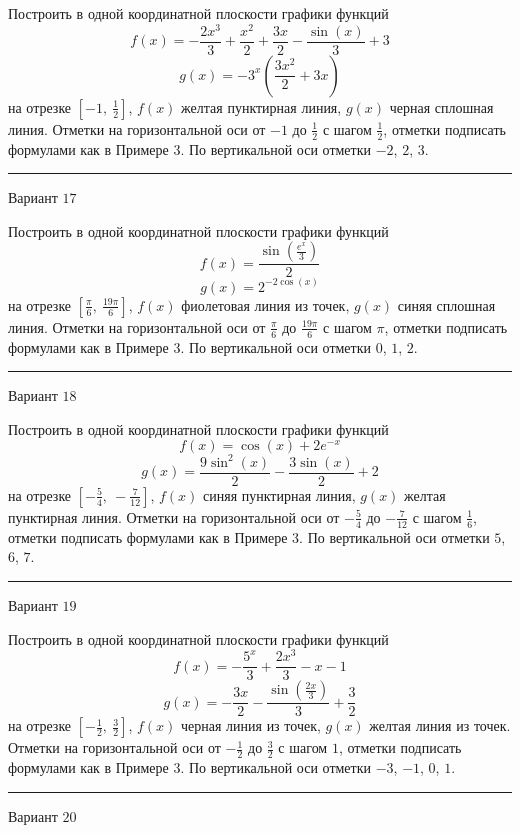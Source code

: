 \documentclass[11pt]{report}
\begin{document}
Построить в одной координатной плоскости графики функций $$f(x) = - \frac{2 x^{3}}{3} + \frac{x^{2}}{2} + \frac{3 x}{2} - \frac{\sin{\left(x \right)}}{3} + 3$$ $$g(x) = - 3^{x} \left(\frac{3 x^{2}}{2} + 3 x\right)$$ на отрезке $\left[-1, \  \frac{1}{2}\right]$, $f(x)$ желтая пунктирная линия, $g(x)$ черная сплошная линия. Отметки на горизонтальной оси от $-1$ до $\frac{1}{2}$ с шагом $\frac{1}{2}$, отметки подписать формулами как в Примере 3. По вертикальной оси отметки $-2$, $2$, $3$.
\begin{center}
\noindent\rule{8cm}{0.4pt}
\end{center}
Вариант $17$


Построить в одной координатной плоскости графики функций $$f(x) = \frac{\sin{\left(\frac{e^{x}}{3} \right)}}{2}$$ $$g(x) = 2^{- 2 \cos{\left(x \right)}}$$ на отрезке $\left[\frac{\pi}{6}, \  \frac{19 \pi}{6}\right]$, $f(x)$ фиолетовая линия из точек, $g(x)$ синяя сплошная линия. Отметки на горизонтальной оси от $\frac{\pi}{6}$ до $\frac{19 \pi}{6}$ с шагом $\pi$, отметки подписать формулами как в Примере 3. По вертикальной оси отметки $0$, $1$, $2$.
\begin{center}
\noindent\rule{8cm}{0.4pt}
\end{center}
Вариант $18$


Построить в одной координатной плоскости графики функций $$f(x) = \cos{\left(x \right)} + 2 e^{- x}$$ $$g(x) = \frac{9 \sin^{2}{\left(x \right)}}{2} - \frac{3 \sin{\left(x \right)}}{2} + 2$$ на отрезке $\left[- \frac{5}{4}, \  - \frac{7}{12}\right]$, $f(x)$ синяя пунктирная линия, $g(x)$ желтая пунктирная линия. Отметки на горизонтальной оси от $- \frac{5}{4}$ до $- \frac{7}{12}$ с шагом $\frac{1}{6}$, отметки подписать формулами как в Примере 3. По вертикальной оси отметки $5$, $6$, $7$.
\begin{center}
\noindent\rule{8cm}{0.4pt}
\end{center}
Вариант $19$


Построить в одной координатной плоскости графики функций $$f(x) = - \frac{5^{x}}{3} + \frac{2 x^{3}}{3} - x - 1$$ $$g(x) = - \frac{3 x}{2} - \frac{\sin{\left(\frac{2 x}{3} \right)}}{3} + \frac{3}{2}$$ на отрезке $\left[- \frac{1}{2}, \  \frac{3}{2}\right]$, $f(x)$ черная линия из точек, $g(x)$ желтая линия из точек. Отметки на горизонтальной оси от $- \frac{1}{2}$ до $\frac{3}{2}$ с шагом $1$, отметки подписать формулами как в Примере 3. По вертикальной оси отметки $-3$, $-1$, $0$, $1$.
\begin{center}
\noindent\rule{8cm}{0.4pt}
\end{center}
Вариант $20$
\end{document}
